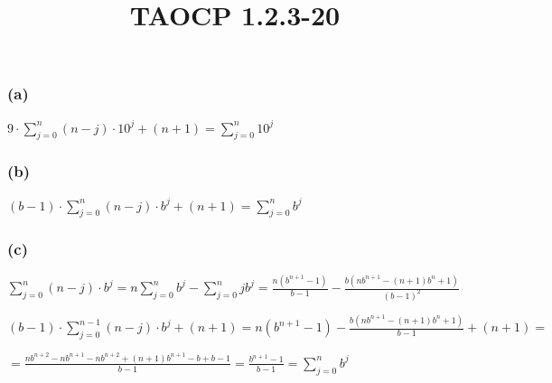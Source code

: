 \documentclass{article}
\title{TAOCP 1.2.3\mbox{-}20}
\begin{document}
\maketitle

\subsubsection*{(a)}

\( 9 \cdot \sum_{j=0}^{n} (n-j)\cdot10^{j} + (n + 1) = \sum_{j=0}^{n} 10^{j} \)

\subsubsection*{(b)}

\( (b-1) \cdot \sum_{j=0}^{n} (n-j)\cdot b^{j} + (n + 1) = \sum_{j=0}^{n} b^{j} \)

\subsubsection*{(c)}

\( \sum_{j=0}^{n} (n-j)\cdot b^{j} = n \sum_{j=0}^{n} b^{j} - \sum_{j=0}^{n} jb^{j} = \frac{n(b^{n+1}-1)}{b-1} - \frac{b(nb^{n+1}-(n+1)b^{n}+1)}{{(b-1)}^{2}} \)

\( (b-1) \cdot \sum_{j=0}^{n-1} (n-j)\cdot b^{j} + (n + 1) = n(b^{n+1}-1) - \frac{b(nb^{n+1}-(n+1)b^{n}+1)}{b-1} + (n+1) = \)

\( = \frac{nb^{n+2} - nb^{n+1} - nb^{n+2} + (n+1)b^{n+1} - b + b - 1}{b-1} = \frac{b^{n+1} - 1}{b-1} = \sum_{j=0}^{n} b^{j} \)
\end{document}
